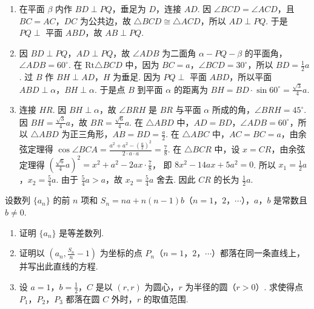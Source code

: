 \begin{solution}
\begin{enumerate}
\item 在平面 \(\beta\) 内作 \(BD \perp PQ\)，垂足为 \(D\)，连接 \(AD\). 因 \(\angle BCD = \angle ACD\)，且 \(BC = AC\)，\(DC\) 为公共边，故 \(\triangle BCD \cong \triangle ACD\)，所以 \(AD \perp PQ\). 于是 \(PQ \perp\) 平面 \(ABD\)，故 \(AB \perp PQ\).

\item 因 \(BD \perp PQ\)，\(AD \perp PQ\)，故 \(\angle ADB\) 为二面角 \(\alpha - PQ - \beta\) 的平面角，\(\angle ADB = 60^{\circ}\). 在 \(\mathrm{Rt}\triangle BCD\) 中，因为 \(BC = a\)，\(\angle BCD = 30^{\circ}\)，所以 \(BD = \frac{1}{2}a\). 过 \(B\) 作 \(BH \perp AD\)，\(H\) 为垂足. 因为 \(PQ \perp\) 平面 \(ABD\)，所以平面 \(ABD \perp \alpha\)，\(BH \perp \alpha\). 于是点 \(B\) 到平面 \(\alpha\) 的距离为 \(BH = BD \cdot \sin 60^{\circ} = \frac{\sqrt{3}}{4}a\).

\item 连接 \(HR\). 因 \(BH \perp \alpha\)，故 \(\angle BRH\) 是 \(BR\) 与平面 \(\alpha\) 所成的角，\(\angle BRH = 45^{\circ}\). 因 \(BH = \frac{\sqrt{3}}{4}a\)，故 \(BR = \frac{\sqrt{6}}{4}a\). 在 \(\triangle ABD\) 中，\(AD = BD\)，\(\angle ADB = 60^{\circ}\)，所以 \(\triangle ABD\) 为正三角形，\(AB = BD = \frac{a}{2}\). 在 \(\triangle ABC\) 中，\(AC = BC = a\)，由余弦定理得 \(\cos \angle BCA = \frac{a^2 + a^2 - \left(\frac{a}{2}\right)^2}{2 \cdot a \cdot a} = \frac{7}{8}\).
在 \(\triangle BCR\) 中，设 \(x = CR\)，由余弦定理得 \(\left(\frac{\sqrt{6}}{4}a\right)^2 = x^2 + a^2 - 2ax \cdot \frac{7}{8}\)，
即 \(8x^2 - 14ax + 5a^2 = 0\). 所以 \(x_1 = \frac{1}{2}a\)，\(x_2 = \frac{5}{4}a\).
由于 \(\frac{5}{4}a > a\)，故 \(x_2 = \frac{5}{4}a\) 舍去. 因此 \(CR\) 的长为 \(\frac{1}{2}a\).
\end{enumerate}
\end{solution}

\begin{problem}
设数列 \(\{a_n\}\) 的前 \(n\) 项和 \(S_n = na + n(n - 1)b\)（\(n = 1\)，\(2\)，\(\cdots\)），\(a\)，\(b\) 是常数且 \(b \neq 0\).

\begin{enumerate}
\item 证明 \(\{a_n\}\) 是等差数列.
\item 证明以 \(\left(a_n, \frac{S_n}{n} - 1\right)\) 为坐标的点 \(P_n\)（\(n = 1\)，\(2\)，\(\cdots\)）都落在同一条直线上，并写出此直线的方程.
\item 设 \(a = 1\)，\(b = \frac{1}{2}\)，\(C\) 是以 \((r,r)\) 为圆心，\(r\) 为半径的圆（\(r > 0\)）. 求使得点 \(P_1\)，\(P_2\)，\(P_3\) 都落在圆 \(C\) 外时，\(r\) 的取值范围.
\end{enumerate}
\end{problem}


